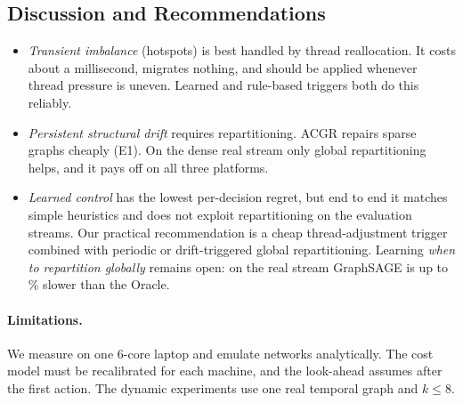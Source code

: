 \begin{table}[t]
\centering
\caption{End-to-end time $J$ (s): sum of per-window median times plus overheads (mean over
seeds for PubMed). Bold: best deployable policy. $^{*}$: $p<0.05$ versus Static (paired
Wilcoxon on per-window times, all seeds).}\label{tab:e3}
\end{table}

\subsection{Discussion and Recommendations}
\begin{itemize}
  \item \emph{Transient imbalance} (hotspots) is best handled by thread reallocation. It
        costs about a millisecond, migrates nothing, and should be applied whenever thread
        pressure is uneven. Learned and rule-based triggers both do this reliably.
  \item \emph{Persistent structural drift} requires repartitioning. ACGR repairs sparse graphs
        cheaply (E1). On the dense real stream only global repartitioning helps, and it pays off
        on all three platforms.
  \item \emph{Learned control} has the lowest per-decision regret, but end to end it matches
        simple heuristics and does not exploit repartitioning on the evaluation streams. Our
        practical recommendation is a cheap thread-adjustment trigger combined with periodic or
        drift-triggered global repartitioning. Learning \emph{when to repartition globally}
        remains open: on the real stream GraphSAGE is up to \RobOracleGap\% slower than the
        Oracle.
\end{itemize}
\paragraph{Limitations.} We measure on one 6-core laptop and emulate networks analytically.
The cost model must be recalibrated for each machine, and the look-ahead assumes \NOA{} after
the first action. The dynamic experiments use one real temporal graph and $k\le 8$.

